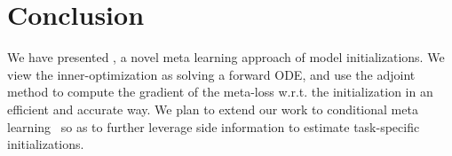 \vspace{-0.05in}
\section{Conclusion}
\vspace{-0.1in}
We have presented  \ours, a novel meta learning approach of model initializations. We view the inner-optimization as solving a forward ODE, and use the adjoint method to compute the gradient of the meta-loss w.r.t. the initialization in an efficient and accurate way. %
We plan to extend our work to conditional meta learning~\citep{denevi2021conditional,wang2020structured} so as to further leverage side information to estimate task-specific initializations. 

